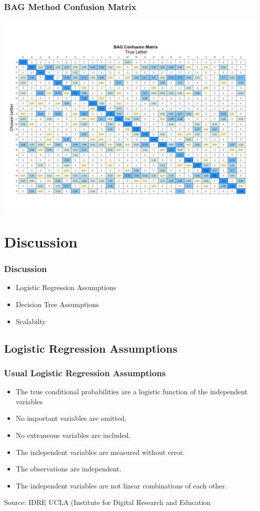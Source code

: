 \documentclass{beamer}
\begin{document}
\begin{frame}
\frametitle{BAG Method Confusion Matrix}
\begin{center} 
\includegraphics[width=.9 \textwidth]{bagConfuse}
\end{center}
\end{frame}


\section{Discussion}
\begin{frame}
\frametitle{Discussion}
\begin{itemize}
\item Logistic Regression Assumptions
\item Decision Tree Assumptions 
\item Scalabilty 
\end{itemize}
\end{frame}

\subsection{Logistic Regression Assumptions}
\begin{frame}
\frametitle{Usual Logistic Regression Assumptions}
\begin{itemize}
\item The true conditional probabilities are a logistic function of the independent variables
\item No important variables are omitted.
\item No extraneous variables are included.
\item The independent variables are measured without error.
\item The observations are independent.
\item The independent variables are not linear combinations of each other.
\end{itemize}

\tiny{Source: IDRE UCLA (Institute for Digital Research and Education}
\end{frame}
\end{document}

